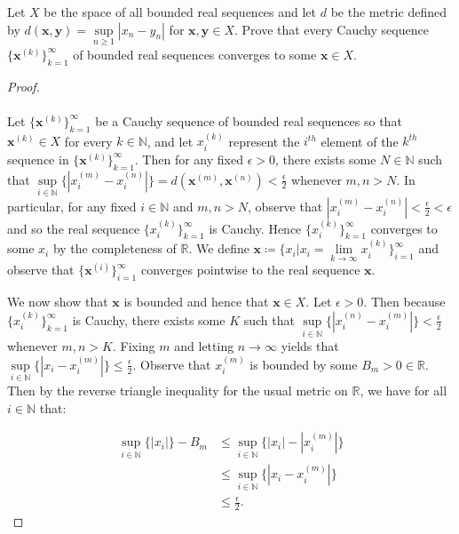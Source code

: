 Let $X$ be the space of all bounded real sequences and let $d$ be the metric
defined by $d(\textbf{x}, \textbf{y}) = \sup\limits_{n \ge 1}{|x_n - y_n|}$
for $\textbf{x}, \textbf{y} \in X$. Prove that every Cauchy sequence 
$\{\textbf{x}^{(k)}\}_{k=1}^{\infty}$ of bounded real sequences converges to some $\textbf{x} \in X$.

\begin{proof}\ \\\\
 Let $\{\textbf{x}^{(k)}\}_{k=1}^{\infty}$ be a Cauchy sequence of bounded real sequences so that
 $\textbf{x}^{(k)} \in X$ for every $k \in \mathbb{N}$, and let $x_i^{(k)}$ represent the $i^{th}$ element of
 the $k^{th}$ sequence in $\{\textbf{x}^{(k)}\}_{k=1}^{\infty}$. Then for any fixed $\epsilon > 0$, there exists some 
 $N \in \mathbb{N}$ such that
 $\sup\limits_{i \in \mathbb{N}}{\{|x_i^{(m)} - x_i^{(n)}|\}} = d(\textbf{x}^{(m)}, \textbf{x}^{(n)}) < \frac{\epsilon}{2}$
 whenever $m, n > N$. In particular, for any fixed $i \in \mathbb{N}$ and $m, n > N$, observe that
 $|x_i^{(m)} - x_i^{(n)}| < \frac{\epsilon}{2} < \epsilon$ and so the real sequence
 $\{x_i^{(k)}\}_{k=1}^{\infty}$ is Cauchy. Hence $\{x_i^{(k)}\}_{k=1}^{\infty}$ converges to some $x_i$ by the 
 completeness of $\mathbb{R}$. We define 
 $\textbf{x} \coloneqq \{x_i \vert x_i=\lim\limits_{k \to \infty}{x_i^{(k)}}\}_{i=1}^{\infty}$ and observe that
 $\{\textbf{x}^{(i)}\}_{i=1}^{\infty}$ converges pointwise to the real sequence $\textbf{x}$.
 
 We now show that $\textbf{x}$ is bounded and hence that $\textbf{x} \in X$. Let $\epsilon > 0$. Then because 
 $\{x_i^{(k)}\}_{k=1}^{\infty}$ is Cauchy, there exists some $K$ such that 
 $\sup\limits_{i \in \mathbb{N}}{\{|x_i^{(n)} - x_i^{(m)}|\}} < \frac{\epsilon}{2}$ whenever $m, n > K$. Fixing $m$ and
 letting $n \to \infty$ yields that $\sup\limits_{i \in \mathbb{N}}{\{|x_i - x_i^{(m)}|\}} \le \frac{\epsilon}{2}$. 
 Observe that $x_i^{(m)}$ is bounded by some $B_m > 0 \in \mathbb{R}$. Then by the reverse triangle inequality for the
 usual metric on $\mathbb{R}$, we have for all $i \in \mathbb{N}$ that:

 \begin{align*}
   \sup\limits_{i \in \mathbb{N}}{\{|x_i|\}} - B_m &\le \sup\limits_{i \in \mathbb{N}}{\{|x_i| - |x_i^{(m)}|\}} \\
                                                   &\le \sup\limits_{i \in \mathbb{N}}{\{|x_i - x_i^{(m)}|\}} \\
                                                   &\le \frac{\epsilon}{2}.
 \end{align*}


\end{proof}
